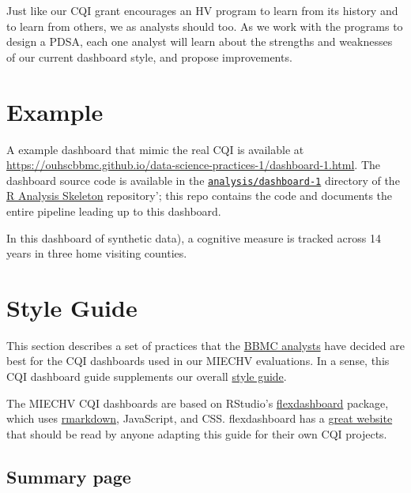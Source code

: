 \documentclass[
]{book}
\begin{document}
Just like our CQI grant encourages an HV program to learn from its history and to learn from others, we as analysts should too. As we work with the programs to design a PDSA, each one analyst will learn about the strengths and weaknesses of our current dashboard style, and propose improvements.

\hypertarget{example-dashboard-example}{%
\section{Example}\label{example-dashboard-example}}

A example dashboard that mimic the real CQI is available at \url{https://ouhscbbmc.github.io/data-science-practices-1/dashboard-1.html}. The dashboard source code is available in the \href{https://github.com/wibeasley/RAnalysisSkeleton/tree/master/analysis/dashboard-1}{\texttt{analysis/dashboard-1}} directory of the \href{https://github.com/wibeasley/RAnalysisSkeleton\#readme}{R Analysis Skeleton} repository'; this repo contains the code and documents the entire pipeline leading up to this dashboard.

In this dashboard of synthetic data), a cognitive measure is tracked across 14 years in three home visiting counties.

\hypertarget{example-dashboard-guide}{%
\section{Style Guide}\label{example-dashboard-guide}}

This section describes a set of practices that the \href{https://ouhsc.edu/bbmc/}{BBMC analysts} have decided are best for the CQI dashboards used in our MIECHV evaluations. In a sense, this CQI dashboard guide supplements our overall \protect\hyperlink{style}{style guide}.

The MIECHV CQI dashboards are based on RStudio's \href{https://rmarkdown.rstudio.com/flexdashboard/}{flexdashboard} package, which uses \href{https://CRAN.R-project.org/package=rmarkdown}{rmarkdown}, JavaScript, and CSS. flexdashboard has a \href{https://rmarkdown.rstudio.com/flexdashboard/}{great website} that should be read by anyone adapting this guide for their own CQI projects.

\hypertarget{summary-page}{%
\subsection{Summary page}\label{summary-page}}
\end{document}
